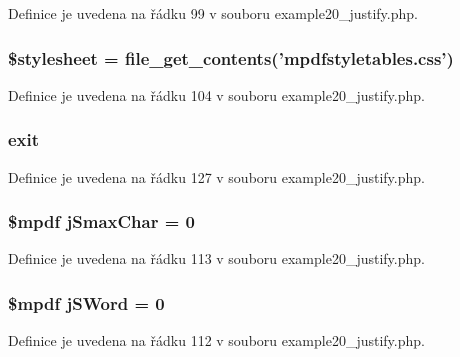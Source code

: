 Definice je uvedena na řádku 99 v souboru example20\-\_\-justify.\-php.

\hypertarget{example20__justify_8php_a19e5cf73e817c55a49205e6ec78c88a8}{
\subsubsection[{\$stylesheet}]{\setlength{\rightskip}{0pt plus 5cm}\$stylesheet = file\-\_\-get\-\_\-contents('mpdfstyletables.\-css')}}\label{example20__justify_8php_a19e5cf73e817c55a49205e6ec78c88a8}


Definice je uvedena na řádku 104 v souboru example20\-\_\-justify.\-php.

\hypertarget{example20__justify_8php_a6733eb5f605d09eaede9845835d71c4e}{
\subsubsection[{exit}]{\setlength{\rightskip}{0pt plus 5cm}exit}}\label{example20__justify_8php_a6733eb5f605d09eaede9845835d71c4e}


Definice je uvedena na řádku 127 v souboru example20\-\_\-justify.\-php.

\hypertarget{example20__justify_8php_adbe88fd58b98ddbc5784838af76215ff}{
\subsubsection[{j\-Smax\-Char}]{\setlength{\rightskip}{0pt plus 5cm}\$mpdf j\-Smax\-Char = 0}}\label{example20__justify_8php_adbe88fd58b98ddbc5784838af76215ff}


Definice je uvedena na řádku 113 v souboru example20\-\_\-justify.\-php.

\hypertarget{example20__justify_8php_aa76c1542a6a06552e112e7c9e63ef8eb}{
\subsubsection[{j\-S\-Word}]{\setlength{\rightskip}{0pt plus 5cm}\$mpdf j\-S\-Word = 0}}\label{example20__justify_8php_aa76c1542a6a06552e112e7c9e63ef8eb}


Definice je uvedena na řádku 112 v souboru example20\-\_\-justify.\-php.

